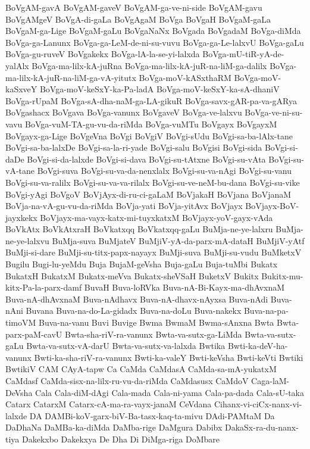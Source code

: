 {BoVgAM-gavA
BoVgAM-gaveV
BoVgAM-ga-ve-ni-side
BoVgAM-gavu
BoVgAMgeV
BoVgA-di-gaLa
BoVgAgaM
BoVga
BoVgaH
BoVgaM-gaLa
BoVgaM-ga-Lige
BoVgaM-gaLu
BoVgaNaNx
BoVgada
BoVgadaM
BoVga-diMda
BoVga-ga-Lanunx
BoVga-ga-LeM-de-ni-su-vuvu
BoVga-ga-Le-lalxvU
BoVga-gaLu
BoVga-gu-ruveV
BoVgakekx
BoVga-lA-la-se-yi-lalxda
BoVga-mU-tiR-yA-de-yalAlx
BoVga-ma-lilx-kA-juRna
BoVga-ma-lilx-kA-juR-na-liM-ga-dalilx
BoVga-ma-lilx-kA-juR-na-liM-ga-vA-yitutx
BoVga-moV-kASxthaRM
BoVga-moV-kaSxveY
BoVga-moV-keSxY-ka-Pa-ladA
BoVga-moV-keSxY-ka-sA-dhaniV
BoVga-rUpaM
BoVga-sA-dha-naM-ga-LA-gikuR
BoVga-savx-gAR-pa-va-gARya
BoVgashacx
BoVgava
BoVga-vanunx
BoVgaveV
BoVga-ve-lalxvu
BoVga-ve-ni-su-vavu
BoVga-vuM-TA-gu-vu-da-riMda
BoVga-vuMTu
BoVgayx
BoVgayxM
BoVgayx-ga-Lige
BoVgeVna
BoVgi
BoVgiV
BoVgi-sUdu
BoVgi-sa-ba-lAlx-tane
BoVgi-sa-ba-lalxDe
BoVgi-sa-la-ri-yade
BoVgi-salu
BoVgisi
BoVgi-sida
BoVgi-si-daDe
BoVgi-si-da-lalxde
BoVgi-si-dava
BoVgi-su-tAtxne
BoVgi-su-vAta
BoVgi-su-vA-tane
BoVgi-suva
BoVgi-su-va-da-nenxlalx
BoVgi-su-va-nAgi
BoVgi-su-vanu
BoVgi-su-va-ralilx
BoVgi-su-va-va-rilalx
BoVgi-su-ve-neM-bu-dana
BoVgi-su-vike
BoVgi-yAgi
BoVgoV
BoVjAyx-di-ru-ci-gaLaM
BoVjakaH
BoVjana
BoVjanaM
BoVja-na-vA-gu-vu-da-riMda
BoVja-yati
BoVja-yitAvx
BoVjayx
BoVjayx-BoV-jayxkekx
BoVjayx-ma-vayx-katx-mi-tuyxkatxM
BoVjayx-yoV-gayx-vAda
BoVkAtx
BoVkAtxraH
BoVkatxqq
BoVkatxqq-gaLu
BuMja-ne-ye-lalxru
BuMja-ne-ye-lalxvu
BuMja-suva
BuMjateV
BuMjiV-yA-da-parx-mA-dataH
BuMjiV-yAtf
BuMji-si-dare
BuMji-su-titx-papx-nayayx
BuMji-suva
BuMji-su-vudu
BuMketxV
Bugilu
Bugi-lu-yeMdu
Buja
BujaM-geVsha
Buja-gaLu
Buja-tuMbi
Bukatx
BukatxH
BukatxM
Bukatx-meVva
Bukatx-sheVSaH
BuketxV
Bukitx
Bukitx-mu-kitx-Pa-la-parx-damf
BuvaH
Buva-loRVka
Buva-nA-Bi-Kayx-ma-dhAvxnaM
Buva-nA-dhAvxnaM
Buva-nAdhavx
Buva-nA-dhavx-nAyxsa
Buva-nAdi
Buva-nAni
Buvana
Buva-na-do-La-gidadx
Buva-na-doLu
Buva-nakekx
Buva-na-pa-timoVM
Buva-na-vanu
Buvi
Buvige
Bwma
BwmaM
Bwma-sAnxna
Bwta
Bwta-parx-paM-cavU
Bwta-sha-riV-ra-vanunx
Bwta-va-sutx-ga-LiMda
Bwta-va-sutx-gaLu
Bwta-va-sutx-vA-darU
Bwta-va-sutx-va-lalxda
Bwtika
Bwti-ka-deV-ha-vanunx
Bwti-ka-sha-riV-ra-vanunx
Bwti-ka-valeY
Bwti-keVsha
Bwti-keVti
Bwtiki
BwtikiV
CAM
CAyA-tapw
Ca
CaMda
CaMdasA
CaMda-sa-mA-yukatxM
CaMdasf
CaMda-sisx-na-lilx-ru-vu-da-riMda
CaMdasusx
CaMdoV
Caga-laM-DeVsha
Cala
Cala-diM-dAgi
Cala-mada
Cala-ni-yama
Cala-pa-dada
Cala-sU-taka
Catarx
CatarxM
Catarx-cA-ma-ra-vayx-janaM
CeVdana
Cihanx-vi-ciCx-nanx-vi-lalxde
DA
DAMBi-koV-garx-biV-Ba-tasx-kaq-ta-mivu
DAdi-PAMtaM
Da
DaDhaNa
DaMBa-ka-diMda
DaMba-rige
DaMgura
Dabibx
DakaSx-ra-du-nanx-tiya
Dakekxbo
Dakekxya
De
Dha
Di
DiMga-riga
DoMbare
}
